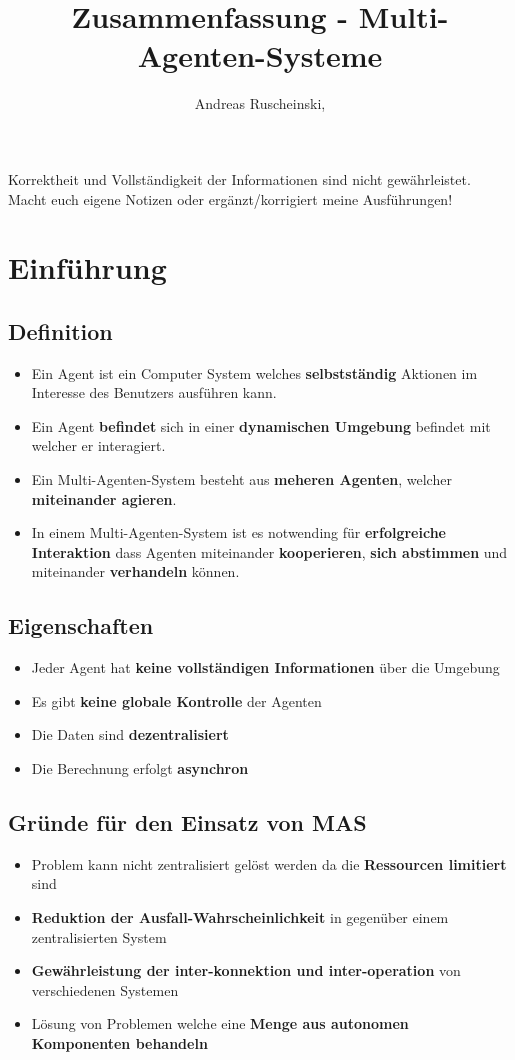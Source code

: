 \documentclass{article} %
\title{Zusammenfassung - Multi-Agenten-Systeme}
\author{
	Andreas Ruscheinski,
}
\begin{document}
\maketitle
\begin{framed}Korrektheit und Vollständigkeit der Informationen sind nicht gewährleistet.
Macht euch eigene Notizen oder ergänzt/korrigiert meine Ausführungen!
\end{framed}
\setcounter{tocdepth}{1}
\tableofcontents

\section{Einführung}
	\subsection{Definition}
	\begin{itemize}
		\item Ein Agent ist ein Computer System welches \textbf{selbstständig} Aktionen im Interesse des Benutzers ausführen kann.
		\item Ein Agent \textbf{befindet} sich in einer \textbf{dynamischen Umgebung} befindet mit welcher er interagiert.
		\item Ein Multi-Agenten-System besteht aus \textbf{meheren Agenten}, welcher \textbf{miteinander agieren}.
		\item In einem Multi-Agenten-System ist es notwending für \textbf{erfolgreiche Interaktion} dass Agenten miteinander \textbf{kooperieren},\textbf{ sich abstimmen} und miteinander \textbf{verhandeln} können.
	\end{itemize}
	\subsection{Eigenschaften}
	\begin{itemize}
		\item Jeder Agent hat \textbf{keine vollständigen Informationen} über die Umgebung
		\item Es gibt \textbf{keine globale Kontrolle} der Agenten
		\item Die Daten sind \textbf{dezentralisiert}
		\item Die Berechnung erfolgt \textbf{asynchron}
	\end{itemize}
	\subsection{Gründe für den Einsatz von MAS}
	\begin{itemize}
		\item Problem kann nicht zentralisiert gelöst werden da die \textbf{Ressourcen limitiert} sind
		\item \textbf{Reduktion der Ausfall-Wahrscheinlichkeit} in gegenüber einem zentralisierten System
		\item \textbf{Gewährleistung der inter-konnektion und inter-operation} von verschiedenen Systemen
		\item Lösung von Problemen welche eine\textbf{ Menge aus autonomen Komponenten behandeln}
	\end{itemize}
\end{document}
